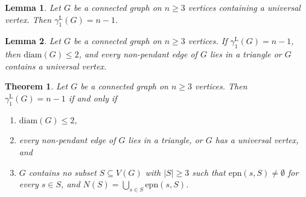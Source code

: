 \documentclass[10pt,a4paper]{amsart}
\newtheorem{theorem}{Theorem}
\newtheorem{lemma}{Lemma}
\newcommand{\epn}{\mbox{epn}}
\newcommand{\gammaenaL}{\gamma_1^{\mathrm L}}
\begin{document}
\begin{lemma}\label{k=1:universal}
Let $G$ be a connected graph on $n\geq 3$ vertices containing a universal vertex. Then $\gammaenaL(G)=n-1$.  
\end{lemma}

\begin{lemma}\label{pendant}
Let $G$ be a connected graph on $n\geq 3$ vertices. 
If $\gamma^{\mathrm L}_1(G)=n-1$, then $\mathrm{diam}(G)\le 2$,
and every non-pendant edge of $G$ lies in a triangle or $G$ contains a universal vertex.
\end{lemma}

\begin{theorem}\label{zg-kar}
Let $G$ be a connected graph on $n\geq 3$ vertices. Then $\gammaenaL(G)=n-1$ if and only if
\begin{enumerate}
\item[(i)] $\mathrm{diam}(G)\leq 2$,
\item[(ii)] every non-pendant edge of $G$ lies in a triangle, or $G$ has a universal vertex, and
\item[(iii)] $G$ contains no subset $S \subseteq V(G)$ with $|S|\ge 3$
such that $\epn(s,S)\neq\emptyset$ for every $s\in S$, and $N(S)=\displaystyle \bigcup _{s\in S}\epn(s,S)$.
\end{enumerate}
\end{theorem}
\end{document}
